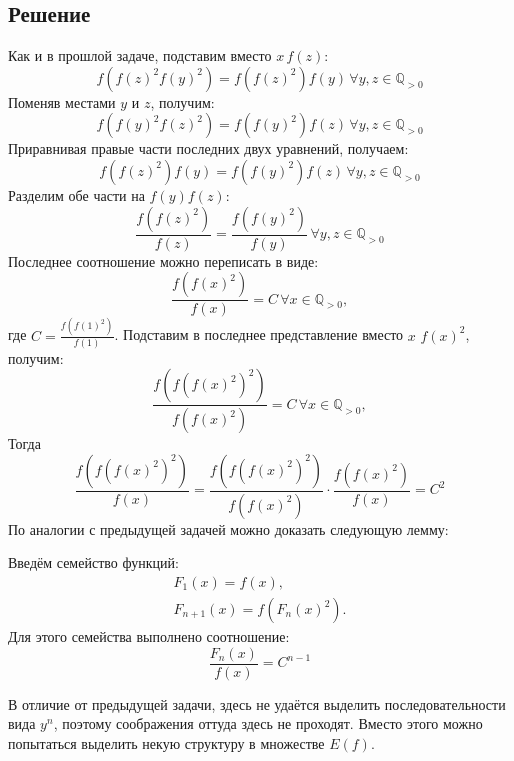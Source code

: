 \documentclass[11pt]{article}
\newcounter{lem}\setcounter{lem}{0}
\def\lm{\par\smallskip\refstepcounter{lem}\textbf{\arabic{lem}}}
\newtheorem*{Lemma}{Лемма \lm}
\newcounter{th}\setcounter{th}{0}
\begin{document}
\subsection{Решение}
\label{sec:orgab53656}
Как и в прошлой задаче, подставим вместо \(x\, f(z)\):
\begin{equation*}
f(f(z)^2f(y)^2) = f(f(z)^2)f(y)\, \forall y, z \in \mathbb{Q}_{>0}
\end{equation*}
Поменяв местами \(y\) и \(z\), получим:
\begin{equation*}
f(f(y)^2f(z)^2) = f(f(y)^2)f(z)\, \forall y, z \in \mathbb{Q}_{>0}
\end{equation*}
Приравнивая правые части последних двух уравнений, получаем:
\begin{equation*}
f(f(z)^2)f(y) = f(f(y)^2)f(z)\, \forall y, z \in \mathbb{Q}_{>0}
\end{equation*}
Разделим обе части на \(f(y)f(z)\):
\begin{equation*}
\frac{f(f(z)^2)}{f(z)} = \frac{f(f(y)^2)}{f(y)} \, \forall y, z \in \mathbb{Q}_{>0}
\end{equation*}
Последнее соотношение можно переписать в виде:
\begin{equation}\label{eq:repr2}
\frac{f(f(x)^2)}{f(x)} = C\, \forall x \in \mathbb{Q}_{>0},
\end{equation}
где $C = \frac{f(f(1)^2)}{f(1)}$.
Подставим в последнее представление вместо \(x\) \(f(x)^2\), получим:
\begin{equation*}
\frac{f(f(f(x)^2)^2)}{f(f(x)^2)} = C\, \forall x \in \mathbb{Q}_{>0},
\end{equation*}
Тогда
\begin{equation*}
\frac{f(f(f(x)^2)^2)}{f(x)} = \frac{f(f(f(x)^2)^2)}{f(f(x)^2)}\cdot\frac{f(f(x)^2)}{f(x)} = C^2
\end{equation*}
По аналогии с предыдущей задачей можно доказать следующую лемму:
\begin{Lemma}
Введём семейство функций:
\begin{gather*}
F_1(x) = f(x), \\
F_{n + 1}(x) = f(F_n(x)^2).
\end{gather*}
Для этого семейства выполнено соотношение:
\begin{equation}\label{eq:repr3}
\frac{F_n(x)}{f(x)} = C^{n - 1}
\end{equation}
\end{Lemma}
В отличие от предыдущей задачи, здесь не удаётся выделить последовательности вида \(y^n\), поэтому соображения оттуда здесь не проходят. Вместо этого можно попытаться выделить некую структуру в множестве \(E(f)\).
\end{document}
